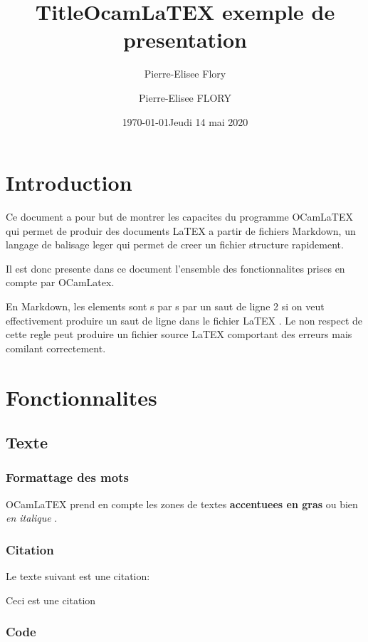 \documentclass[11pt, a4paper]{article}
\title{Title}
\author{Pierre-Elisee Flory}
\date{\small \today}
\title{OcamLaTEX exemple de presentation}
\author{Pierre-Elisee FLORY}
\date{\small Jeudi 14 mai 2020}
\begin{document}
\maketitle
\newpage

\section{Introduction}

Ce document a pour but de montrer les capacites du programme OCamLaTEX qui permet de produir des documents LaTEX a partir de fichiers Markdown, un langage de balisage leger qui permet de creer un fichier structure rapidement.

Il est donc presente dans ce document l'ensemble des fonctionnalites prises en compte par OCamLatex.

En Markdown, les elements sont s
par
s par un saut de ligne 
2 si on veut effectivement produire un saut de ligne dans le fichier LaTEX
. Le non respect de cette regle peut produire un fichier source LaTEX comportant des erreurs mais comilant correctement.

\section{Fonctionnalites}

\subsection{Texte}

\subsubsection{Formattage des mots}

OCamLaTEX prend en compte les zones de textes 
\textbf{accentuees en gras}
 ou bien 
\textit{en italique}
.

\subsubsection{Citation}

Le texte suivant est une citation:

\begin{displayquote}
 Ceci est une citation
\end{displayquote}

\subsubsection{Code}
\end{document}
